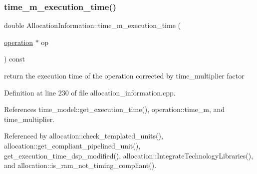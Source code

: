\subsubsection{\texorpdfstring{time\+\_\+m\+\_\+execution\+\_\+time()}{time\_m\_execution\_time()}}
{\footnotesize\ttfamily double Allocation\+Information\+::time\+\_\+m\+\_\+execution\+\_\+time (\begin{DoxyParamCaption}\item[{\hyperlink{structoperation}{operation} $\ast$}]{op }\end{DoxyParamCaption}) const\hspace{0.3cm}{\ttfamily [private]}}



return the execution time of the operation corrected by time\+\_\+multiplier factor 



Definition at line 230 of file allocation\+\_\+information.\+cpp.



References time\+\_\+model\+::get\+\_\+execution\+\_\+time(), operation\+::time\+\_\+m, and time\+\_\+multiplier.



Referenced by allocation\+::check\+\_\+templated\+\_\+units(), allocation\+::get\+\_\+compliant\+\_\+pipelined\+\_\+unit(), get\+\_\+execution\+\_\+time\+\_\+dsp\+\_\+modified(), allocation\+::\+Integrate\+Technology\+Libraries(), and allocation\+::is\+\_\+ram\+\_\+not\+\_\+timing\+\_\+compliant().

